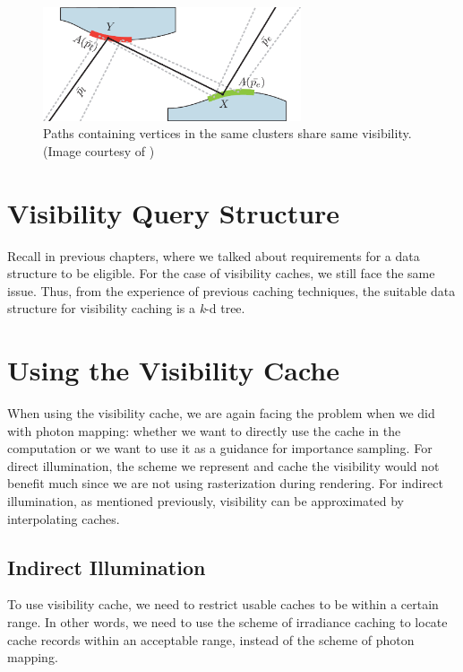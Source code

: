 \documentclass[]{book}
\begin{document}
\begin{figure}[b]
	\centering
	\includegraphics[width=3.0in]{img/VC-3-cluster.png}
	\caption[Clustered Visibility]{Paths containing vertices in the same clusters share same visibility. (Image courtesy of \citeauthor{popov2013adaptive})}
	\label{fig:VC:cluster}
\end{figure}

\section{Visibility Query Structure}
\label{sec:VC:structure}
Recall in previous chapters, where we talked about requirements for a data structure to be eligible.
For the case of visibility caches, we still face the same issue.
Thus, from the experience of previous caching techniques, the suitable data structure for visibility caching is a \textit{k}-d tree.

\section{Using the Visibility Cache}
\label{sec:VC:render}
When using the visibility cache, we are again facing the problem when we did with photon mapping: whether we want to directly use the cache in the computation or we want to use it as a guidance for importance sampling.
For direct illumination, the scheme we represent and cache the visibility would not benefit much since we are not using rasterization during rendering.
For indirect illumination, as mentioned previously, visibility can be approximated by interpolating caches.

\subsection{Indirect Illumination}
\label{sec:VC:render:indirect}
To use visibility cache, we need to restrict usable caches to be within a certain range.
In other words, we need to use the scheme of irradiance caching to locate cache records within an acceptable range, instead of the scheme of photon mapping.
\end{document}
